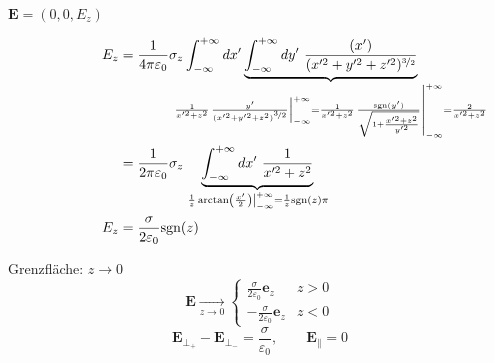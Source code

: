 \documentclass[titlepage,11pt,a4paper,ngerman]{report}
\newcommand{\kq}{\frac{1}{4\pi\epsilon_0}}
\newcommand{\intt}[2]{\int_{#1}^{#2}}
\renewcommand{\vec}[1]{\boldsymbol{#1}}
\renewcommand{\epsilon}{\varepsilon}
\begin{document}
$\vec{E} = (0,0,E_z)$

\begin{align*}
 	E_z &= \kq \sigma_z \intt{-\infty}{+\infty}dx'\underbrace{\intt{-\infty}{+\infty}dy'\ \frac{(x')}{(x'^2 + y'^2 + z'^2)^{\nicefrac{3}{2}}}}_{\mathclap{\frac{1}{x'^2 +z^2}\left.\frac{y'}{(x'^2 + y'^2 + z^2)^{\nicefrac{3}{2}}} \right\rvert_{-\infty}^{+\infty} = \frac{1}{x'^2 +z^2}\left.\frac{\textrm{sgn}(y')}{\sqrt{1 + \frac{x'^2 + z^2}{y'^2}}} \right\rvert_{-\infty}^{+\infty} = \frac{2}{x'^2 +z^2}}}\\
 	&= \frac{1}{2 \pi \epsilon_0} \sigma_z \underbrace{\intt{-\infty}{+\infty} dx'\ \frac{1}{x'^2 + z^2}}_{\left. \frac{1}{z} \arctan \left(\frac{x'}{2}\right)\right\rvert_{-\infty}^{+\infty} = \frac{1}{z} \textrm{sgn}(z)\pi}\\
 	E_z &= \frac{\sigma}{2 \epsilon_0} \textrm{sgn}(z)
\end{align*}
\begin{minipage}{.6\linewidth}
	Grenzfläche: $z \rightarrow 0$
	$$\vec{E} \underset{z \to 0} \longrightarrow \left\{ \begin{array}{cc}
	\frac{\sigma}{2 \epsilon_0} \vec{e}_z & z > 0\\
	-\frac{\sigma}{2 \epsilon_0} \vec{e}_z & z < 0
	\end{array}\right.$$
	$$\vec{E}_{\perp_+} - \vec{E}_{\perp_-} = \frac{\sigma}{\epsilon_0}, \qquad \vec{E}_\parallel = 0$$
\end{minipage}
\begin{minipage}{.4\linewidth}
	\centering
\end{minipage}
\end{document}
